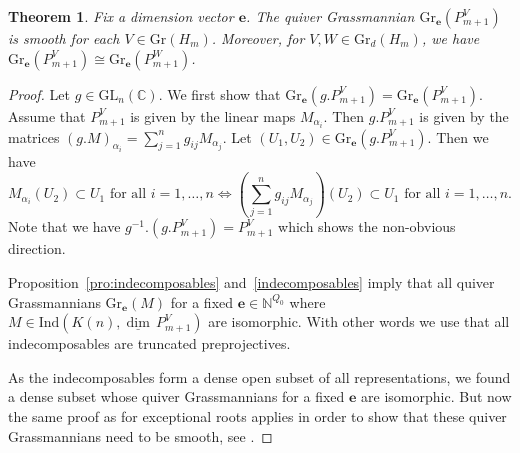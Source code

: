 \documentclass{amsart}
\newtheorem{theorem}{Theorem}[section]
\numberwithin{equation}{section}
\newcommand{\CC}{\mathbb{C}}
\newcommand{\NN}{\mathbb{N}}
\newcommand{\bfe}{\mathbf{e}}
\newcommand\udim{{\underline{\dim}\, }}
\newcommand{\Gr}{\mathrm{Gr}}
\newcommand{\GL}{\mathrm{GL}}
\newcommand{\Ind}{\mathrm{Ind}}
\begin{document}
\begin{theorem}\label{thm:truncpp}
  Fix a dimension vector $\bfe$.
  The quiver Grassmannian $\Gr_\bfe(P_{m+1}^V)$ is smooth for each $V\in \Gr(H_m)$.
  Moreover, for $V,W\in \Gr_d(H_m)$, we have $\Gr_\bfe(P_{m+1}^V)\cong \Gr_\bfe(P_{m+1}^W)$.
\end{theorem}
\begin{proof}
  Let $g\in\GL_n(\CC)$.
  We first show that $\Gr_\bfe(g.P_{m+1}^V)=\Gr_\bfe(P_{m+1}^V)$.
  Assume that $P_{m+1}^V$ is given by the linear maps $M_{\alpha_i}$.
  Then $g.P_{m+1}^V$ is given by the matrices $(g.M)_{\alpha_i}=\sum\limits_{j=1}^n g_{ij}M_{\alpha_j}$.
  Let $(U_1,U_2)\in\Gr_\bfe(g.P_{m+1}^V)$.
  Then we have  
  \[M_{\alpha_i}(U_2)\subset U_1 \text{ for all } i=1,\ldots,n\Leftrightarrow \left(\sum\limits_{j=1}^n g_{ij}M_{\alpha_j}\right)(U_2)\subset U_1 \text{ for all } i=1,\ldots,n.\]
  Note that we have $g^{-1}.(g.P_{m+1}^V)=P_{m+1}^V$ which shows the non-obvious direction.

  Proposition~\ref{pro:indecomposables} and~\ref{indecomposables} imply that all quiver Grassmannians $\Gr_\bfe(M)$ for a fixed $\bfe\in\NN^{Q_0}$ where $M\in\Ind(K(n),\udim P_{m+1}^V)$ are isomorphic.
  With other words we use that all indecomposables are truncated preprojectives.

  As the indecomposables form a dense open subset of all representations, we found a dense subset whose quiver Grassmannians for a fixed $\bfe$ are isomorphic.
  But now the same proof as for exceptional roots applies in order to show that these quiver Grassmannians need to be smooth, see \cite[Corollary 4]{cr}.
\end{proof}
\end{document}
